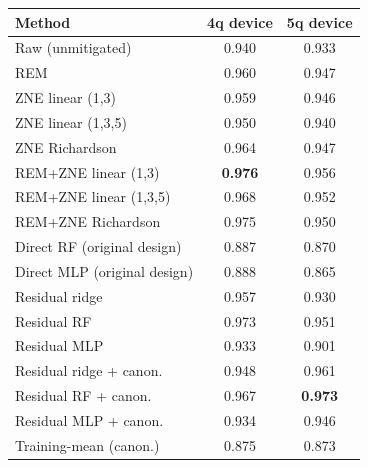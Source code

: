 \begin{tabular}{lcc}
\toprule
Method & 4q device & 5q device \\
\midrule
Raw (unmitigated) & 0.940 & 0.933 \\
REM & 0.960 & 0.947 \\
ZNE linear (1,3) & 0.959 & 0.946 \\
ZNE linear (1,3,5) & 0.950 & 0.940 \\
ZNE Richardson & 0.964 & 0.947 \\
REM+ZNE linear (1,3) & \textbf{0.976} & 0.956 \\
REM+ZNE linear (1,3,5) & 0.968 & 0.952 \\
REM+ZNE Richardson & 0.975 & 0.950 \\
\midrule

Direct RF (original design) & 0.887 & 0.870 \\
Direct MLP (original design) & 0.888 & 0.865 \\
Residual ridge & 0.957 & 0.930 \\
Residual RF & 0.973 & 0.951 \\
Residual MLP & 0.933 & 0.901 \\
Residual ridge + canon. & 0.948 & 0.961 \\
Residual RF + canon. & 0.967 & \textbf{0.973} \\
Residual MLP + canon. & 0.934 & 0.946 \\
Training-mean (canon.) & 0.875 & 0.873 \\
\midrule

\bottomrule
\end{tabular}